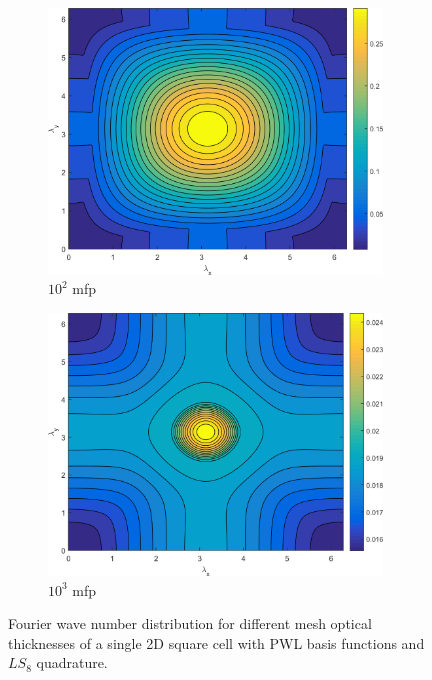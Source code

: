 \begin{figure}
{\begin{subfigure}[b]{0.485\textwidth}
		\centering
		\includegraphics[width=0.975\textwidth]{figures/appendices/SI_M4S_UPWLD1_LS8_x=100_dydx=1_contour.png}
		\caption{$10^{2}$ mfp}
	\end{subfigure}
	\hfill
	\begin{subfigure}[b]{0.485\textwidth}
		\centering
		\includegraphics[width=0.975\textwidth]{figures/appendices/SI_M4S_UPWLD1_LS8_x=1000_dydx=1_contour.png}
		\caption{$10^{3}$ mfp}
	\end{subfigure}
	}
\caption{Fourier wave number distribution for different mesh optical thicknesses of a single 2D square cell with PWL basis functions and $LS_{8}$ quadrature.}
\label{fig::App_DSA_M4S_LS8}
\end{figure}

